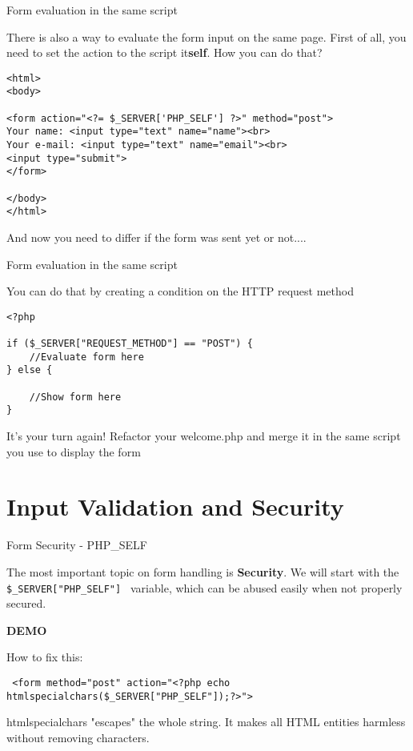 \begin{frame}[fragile]{Form evaluation in the same script}

	There is also a way to evaluate the form input on the same page. \pause
	First of all, you need to set the action to the script it\textbf{self}. How you can do that? \pause
	
	\begin{lstlisting}
<html>
<body>

<form action="<?= $_SERVER['PHP_SELF'] ?>" method="post">
Your name: <input type="text" name="name"><br>
Your e-mail: <input type="text" name="email"><br>
<input type="submit">
</form>

</body>
</html> 
	\end{lstlisting}
	\pause
	
	And now you need to differ if the form was sent yet or not....
\end{frame}

\begin{frame}[fragile]{Form evaluation in the same script}

	You can do that by creating a condition on the HTTP request method \pause
	
	\begin{lstlisting}
<?php

if ($_SERVER["REQUEST_METHOD"] == "POST") {
	//Evaluate form here
} else {

	//Show form here
}
	\end{lstlisting}
	\pause
	
	It's your turn again! Refactor your welcome.php and merge it in the same script you use to display the form
\end{frame}

\section{Input Validation and Security}


\begin{frame}[fragile]{Form Security - PHP\_{}SELF}

	The most important topic on form handling is \textbf{Security}. \pause
	We will start with the \texttt{\$\_{}SERVER["PHP\_{}SELF"] } variable, which can be abused easily when not properly secured. \pause
	
	\textbf{DEMO} \pause
	
	How to fix this: \pause
	\begin{lstlisting}
 <form method="post" action="<?php echo htmlspecialchars($_SERVER["PHP_SELF"]);?>">
	\end{lstlisting}
	\pause
	
	htmlspecialchars "escapes" the whole string. It makes all HTML entities harmless without removing characters.
	

\end{frame}

